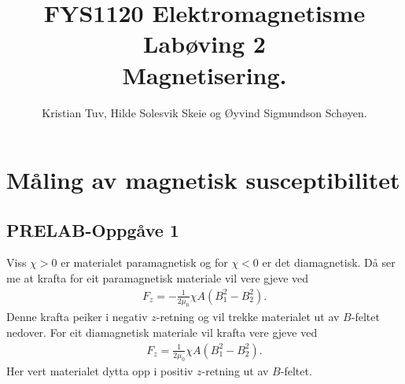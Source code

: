 \documentclass[11pt, a4paper]{article}
\begin{document}
\begin{titlepage}

  \title{\normalsize FYS1120 Elektromagnetisme\\
    \vspace{10mm}
    \huge Labøving 2\\
    \vspace{10mm}
    \normalsize{\bf Magnetisering.}}

  \author{Kristian Tuv, Hilde Solesvik Skeie og Øyvind Sigmundson Schøyen.}

\end{titlepage}

\maketitle

\newpage
  \tableofcontents
\newpage

\section*{Måling av magnetisk susceptibilitet}

  \subsection*{PRELAB-Oppgåve 1}
    Viss $\chi > 0$ er materialet paramagnetisk og for $\chi < 0$ er det diamagnetisk. Då ser me at krafta for eit paramagnetisk materiale vil vere gjeve ved
    \begin{align*}
      F_z = -\frac{1}{2\mu_0}\chi A\left( B_1^2 - B_2^2 \right).
    \end{align*}
    Denne krafta peiker i negativ $z$-retning og vil trekke materialet ut av $B$-feltet nedover.
    For eit diamagnetisk materiale vil krafta vere gjeve ved
    \begin{align*}
      F_z = \frac{1}{2\mu_0}\chi A\left( B_1^2 - B_2^2 \right).
    \end{align*}
    Her vert materialet dytta opp i positiv $z$-retning ut av $B$-feltet.
\end{document}
